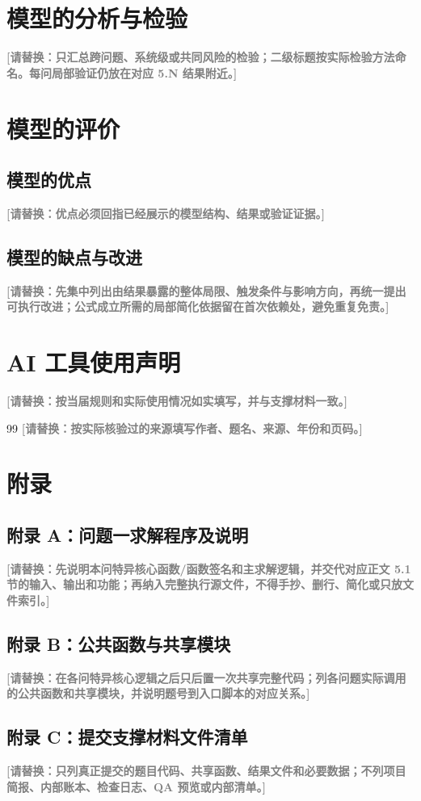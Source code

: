 \documentclass[12pt,a4paper]{ctexart}
\newcommand{\placeholder}[1]{\textcolor{gray}{\textbf{[请替换：#1]}}}
\begin{document}

\section{模型的分析与检验}
\placeholder{只汇总跨问题、系统级或共同风险的检验；二级标题按实际检验方法命名。每问局部验证仍放在对应 5.N 结果附近。}

\section{模型的评价}
\subsection{模型的优点}
\placeholder{优点必须回指已经展示的模型结构、结果或验证证据。}
\subsection{模型的缺点与改进}
\placeholder{先集中列出由结果暴露的整体局限、触发条件与影响方向，再统一提出可执行改进；公式成立所需的局部简化依据留在首次依赖处，避免重复免责。}

\section*{AI 工具使用声明}
\placeholder{按当届规则和实际使用情况如实填写，并与支撑材料一致。}

\begin{thebibliography}{99}
 \placeholder{按实际核验过的来源填写作者、题名、来源、年份和页码。}
\end{thebibliography}

\newpage
\appendix
\section*{附录}
\subsection*{附录 A：问题一求解程序及说明}
\placeholder{先说明本问特异核心函数/函数签名和主求解逻辑，并交代对应正文 5.1 节的输入、输出和功能；再纳入完整执行源文件，不得手抄、删行、简化或只放文件索引。}
% 

\subsection*{附录 B：公共函数与共享模块}
\placeholder{在各问特异核心逻辑之后只后置一次共享完整代码；列各问题实际调用的公共函数和共享模块，并说明题号到入口脚本的对应关系。}

\subsection*{附录 C：提交支撑材料文件清单}
\placeholder{只列真正提交的题目代码、共享函数、结果文件和必要数据；不列项目简报、内部账本、检查日志、QA 预览或内部清单。}
\end{document}
